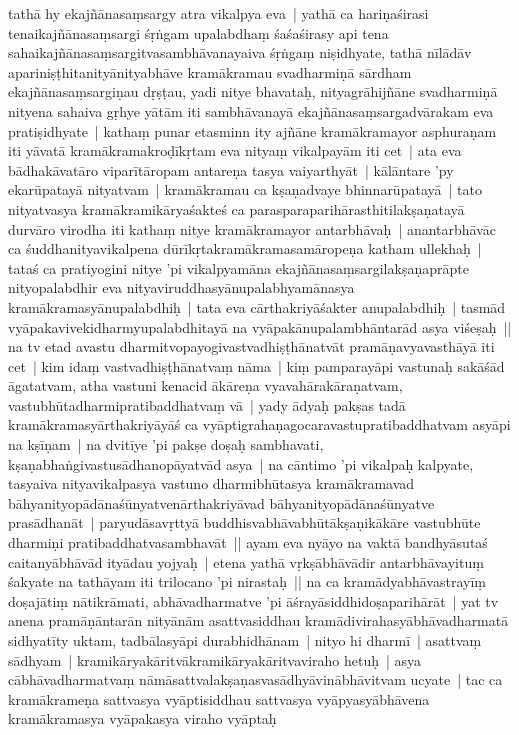 \documentclass[article,a4paper]{memoir}
\newcommand{\persName}[1]{#1}
\begin{document}
	  \pstart tathā\- hy ekajñā\-nasaṃsargy atra vikalpya eva | yathā\- ca hariṇaśirasi tenaikajñā\-nasaṃsargi śṛṅgam upalabdhaṃ śaśaśirasy api tena sahaikajñā\-nasaṃsargitvasambhā\-vanayaiva śṛṅgaṃ niṣidhyate, tathā\- nī\-lā\-dā\-v apariniṣṭhitanityā\-nityabhā\-ve kramā\-kramau svadharmiṇā\- sā\-rdham ekajñā\-nasaṃsargiṇau dṛṣṭau, yadi nitye bhavataḥ, nityagrā\-hijñā\-ne svadharmiṇā\- nityena sahaiva gṛhye yā\-tā\-m iti sambhā\-vanayā\- ekajñā\-nasaṃsargadvā\-rakam eva pratiṣidhyate | kathaṃ punar etasminn ity ajñā\-ne kramā\-kramayor asphuraṇam iti yā\-vatā\- kramā\-kramakroḍī\-kṛtam eva nityaṃ vikalpayā\-m iti cet | ata eva bā\-dhakā\-vatā\-ro viparī\-tā\-ropam antareṇa tasya vaiyarthyā\-t | \label{thakur75-92.17} kā\-lā\-ntare 'py ekarū\-patayā\- nityatvam | kramā\-kramau ca kṣaṇadvaye bhinnarū\-patayā\- | tato nityatvasya kramā\-kramikā\-ryaśakteś ca parasparaparihā\-rasthitilakṣaṇatayā\- durvā\-ro virodha iti kathaṃ nitye kramā\-kramayor antarbhā\-vaḥ | anantarbhā\-vā\-c ca śuddhanityavikalpena dū\-rī\-kṛtakramā\-kramasamā\-ropeṇa katham ullekhaḥ | tataś ca pratiyogini nitye 'pi vikalpyamā\-na ekajñā\-nasaṃsargilakṣaṇaprā\-pte nityopalabdhir eva nityaviruddhasyā\-nupalabhyamā\-nasya kramā\-kramasyā\-nupalabdhiḥ | tata eva cā\-rthakriyā\-śakter anupalabdhiḥ | tasmā\-d vyā\-pakavivekidharmyupalabdhitayā\- na vyā\-pakā\-nupalambhā\-ntarā\-d asya viśeṣaḥ || \label{thakur75-92.25} na tv etad avastu dharmitvopayogivastvadhiṣṭhā\-natvā\-t pramā\-ṇavyavasthā\-yā\- iti cet | kim idaṃ vastvadhiṣṭhā\-natvaṃ nā\-ma | kiṃ pamparayā\-pi vastunaḥ sakā\-śā\-d ā\-gatatvam, atha vastuni kenacid ā\-kā\-reṇa vyavahā\-rakā\-raṇatvam, vastubhū\-tadharmipratibaddhatvaṃ vā\- | \label{thakur75-93.1} yady ā\-dyaḥ pakṣas tadā\- kramā\-kramasyā\-rthakriyā\-yā\-ś ca vyā\-ptigrahaṇagocaravastupratibaddhatvam asyā\-pi na kṣī\-ṇam | \label{thakur75-93.2} na dvitī\-ye 'pi pakṣe doṣaḥ sambhavati, kṣaṇabhaṅgivastusā\-dhanopā\-yatvā\-d asya | \label{thakur75-93.3} na cā\-ntimo 'pi vikalpaḥ kalpyate, tasyaiva nityavikalpasya vastuno dharmibhū\-tasya kramā\-kramavad bā\-hyanityopā\-dā\-naśū\-nyatvenā\-rthakriyā\-vad bā\-hyanityopā\-dā\-naśū\-nyatve prasā\-dhanā\-t | paryudā\-savṛttyā\- buddhisvabhā\-vabhū\-tā\-kṣaṇikā\-kā\-re vastubhū\-te dharmiṇi pratibaddhatvasambhavā\-t || \label{thakur75-93.7} ayam eva nyā\-yo na vaktā\- bandhyā\-sutaś caitanyā\-bhā\-vā\-d ityā\-dau yojyaḥ | etena yathā\- vṛkṣā\-bhā\-vā\-dir antarbhā\-vayituṃ śakyate na tathā\-yam iti \persName{trilocano} 'pi nirastaḥ || \label{thakur75-93.10} na ca kramā\-dyabhā\-vastrayī\-ṃ doṣajā\-tiṃ nā\-tikrā\-mati, abhā\-vadharmatve 'pi ā\-śrayā\-siddhidoṣaparihā\-rā\-t | \label{thakur75-93.11} yat tv anena pramā\-ṇā\-ntarā\-n nityā\-nā\-m asattvasiddhau kramā\-divirahasyā\-bhā\-vadharmatā\- sidhyatī\-ty uktam, tadbā\-lasyā\-pi durabhidhā\-nam | nityo hi dharmī\- | asattvaṃ sā\-dhyam | kramikā\-ryakā\-ritvā\-kramikā\-ryakā\-ritvaviraho hetuḥ | asya cā\-bhā\-vadharmatvaṃ nā\-mā\-sattvalakṣaṇasvasā\-dhyā\-vinā\-bhā\-vitvam ucyate | tac ca kramā\-krameṇa sattvasya vyā\-ptisiddhau sattvasya vyā\-pyasyā\-bhā\-vena kramā\-kramasya vyā\-pakasya viraho vyā\-ptaḥ 
\end{document}
